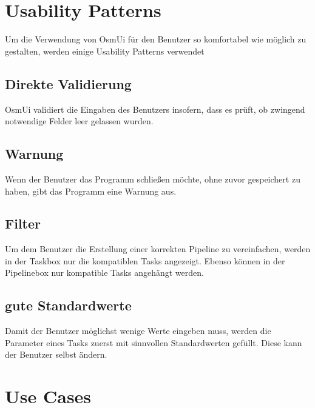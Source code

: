 \documentclass[a4paper,12pt]{scrartcl}
\begin{document}
\section{Usability Patterns}
Um die Verwendung von OsmUi für den Benutzer so komfortabel wie möglich zu gestalten, werden einige Usability Patterns verwendet
\subsection{Direkte Validierung}
OsmUi validiert die Eingaben des Benutzers insofern, dass es prüft, ob zwingend notwendige Felder leer gelassen wurden.
\subsection{Warnung}
Wenn der Benutzer das Programm schließen möchte, ohne zuvor gespeichert zu haben, gibt das Programm eine Warnung aus.
\subsection{Filter}
Um dem Benutzer die Erstellung einer korrekten Pipeline zu vereinfachen, werden in der Taskbox nur die kompatiblen Tasks angezeigt. Ebenso können in der Pipelinebox nur kompatible Tasks angehängt werden.
\subsection{gute Standardwerte}
Damit der Benutzer möglichst wenige Werte eingeben muss, werden die Parameter eines Tasks zuerst mit sinnvollen Standardwerten gefüllt. Diese kann der Benutzer selbst ändern.

\section{Use Cases}
\end{document}
